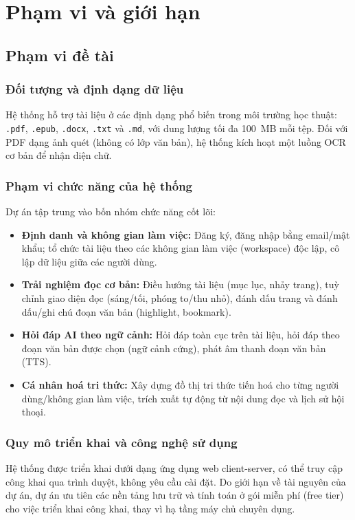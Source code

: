 \section{Phạm vi và giới hạn}
\subsection{Phạm vi đề tài}
\subsubsection{Đối tượng và định dạng dữ liệu}
Hệ thống hỗ trợ tài liệu ở các định dạng phổ biến trong môi trường học thuật: \texttt{.pdf}, \texttt{.epub}, \texttt{.docx}, \texttt{.txt} và \texttt{.md}, với dung lượng tối đa 100~MB mỗi tệp. Đối với PDF dạng ảnh quét (không có lớp văn bản), hệ thống kích hoạt một luồng OCR cơ bản để nhận diện chữ.

\subsubsection{Phạm vi chức năng của hệ thống}
Dự án tập trung vào bốn nhóm chức năng cốt lõi:
\begin{itemize}
    \item \textbf{Định danh và không gian làm việc:} Đăng ký, đăng nhập bằng email/mật khẩu; tổ chức tài liệu theo các không gian làm việc (workspace) độc lập, cô lập dữ liệu giữa các người dùng.
    \item \textbf{Trải nghiệm đọc cơ bản:} Điều hướng tài liệu (mục lục, nhảy trang), tuỳ chỉnh giao diện đọc (sáng/tối, phóng to/thu nhỏ), đánh dấu trang và đánh dấu/ghi chú đoạn văn bản (highlight, bookmark).
    \item \textbf{Hỏi đáp AI theo ngữ cảnh:} Hỏi đáp toàn cục trên tài liệu, hỏi đáp theo đoạn văn bản được chọn (ngữ cảnh cứng), phát âm thanh đoạn văn bản (TTS).
    \item \textbf{Cá nhân hoá tri thức:} Xây dựng đồ thị tri thức tiến hoá cho từng người dùng/không gian làm việc, trích xuất tự động từ nội dung đọc và lịch sử hội thoại.
\end{itemize}

\subsubsection{Quy mô triển khai và công nghệ sử dụng}
Hệ thống được triển khai dưới dạng ứng dụng web client-server, có thể truy cập công khai qua trình duyệt, không yêu cầu cài đặt. Do giới hạn về tài nguyên của dự án, dự án ưu tiên các nền tảng lưu trữ và tính toán ở gói miễn phí (free tier) cho việc triển khai công khai, thay vì hạ tầng máy chủ chuyên dụng.

